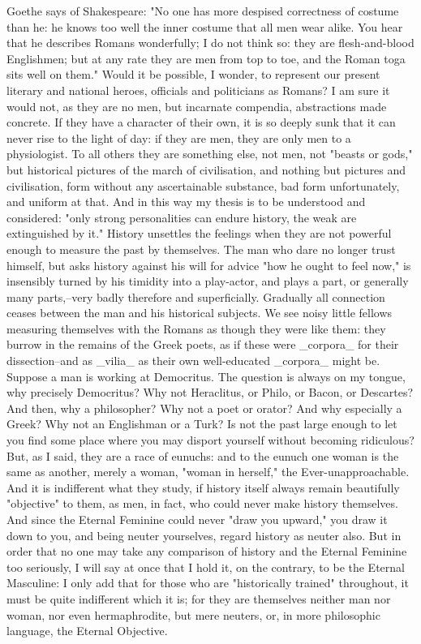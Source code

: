 Goethe says of Shakespeare: "No one has more despised correctness of
costume than he: he knows too well the inner costume that all men
wear alike. You hear that he describes Romans wonderfully; I do not
think so: they are flesh-and-blood Englishmen; but at any rate they
are men from top to toe, and the Roman toga sits well on them." Would
it be possible, I wonder, to represent our present literary and
national heroes, officials and politicians as Romans? I am sure it
would not, as they are no men, but incarnate compendia, abstractions
made concrete. If they have a character of their own, it is so deeply
sunk that it can never rise to the light of day: if they are men,
they are only men to a physiologist. To all others they are something
else, not men, not "beasts or gods," but historical pictures of the
march of civilisation, and nothing but pictures and civilisation,
form without any ascertainable substance, bad form unfortunately, and
uniform at that. And in this way my thesis is to be understood and
considered: "only strong personalities can endure history, the weak
are extinguished by it." History unsettles the feelings when they are
not powerful enough to measure the past by themselves. The man who
dare no longer trust himself, but asks history against his will for
advice "how he ought to feel now," is insensibly turned by his
timidity into a play-actor, and plays a part, or generally many
parts,--very badly therefore and superficially. Gradually all
connection ceases between the man and his historical subjects. We see
noisy little fellows measuring themselves with the Romans as though
they were like them: they burrow in the remains of the Greek poets,
as if these were _corpora_ for their dissection--and as _vilia_ as
their own well-educated _corpora_ might be. Suppose a man is working
at Democritus. The question is always on my tongue, why precisely
Democritus? Why not Heraclitus, or Philo, or Bacon, or Descartes? And
then, why a philosopher? Why not a poet or orator? And why especially
a Greek? Why not an Englishman or a Turk? Is not the past large
enough to let you find some place where you may disport yourself
without becoming ridiculous? But, as I said, they are a race of
eunuchs: and to the eunuch one woman is the same as another, merely a
woman, "woman in herself," the Ever-unapproachable. And it is
indifferent what they study, if history itself always remain
beautifully "objective" to them, as men, in fact, who could never
make history themselves. And since the Eternal Feminine could never
"draw you upward," you draw it down to you, and being neuter
yourselves, regard history as neuter also. But in order that no one
may take any comparison of history and the Eternal Feminine too
seriously, I will say at once that I hold it, on the contrary, to be
the Eternal Masculine: I only add that for those who are
"historically trained" throughout, it must be quite indifferent which
it is; for they are themselves neither man nor woman, nor even
hermaphrodite, but mere neuters, or, in more philosophic language,
the Eternal Objective.

